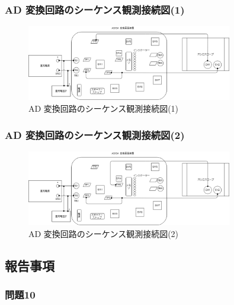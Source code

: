 \documentclass[10pt]{article}
\begin{document}
\subsubsection{AD 変換回路のシーケンス観測接続図(1)}
	\begin{figure}[H]
		\centering
		\includegraphics[width=0.8\textwidth]{exp31.png}
		\caption{AD 変換回路のシーケンス観測接続図(1)}
	\end{figure}
	
\subsubsection{AD 変換回路のシーケンス観測接続図(2)}
	\begin{figure}[H]
		\centering
		\includegraphics[width=0.8\textwidth]{exp32.png}
		\caption{AD 変換回路のシーケンス観測接続図(2)}
	\end{figure}
 

\subsection{報告事項}
\subsubsection{問題10}
\end{document}
